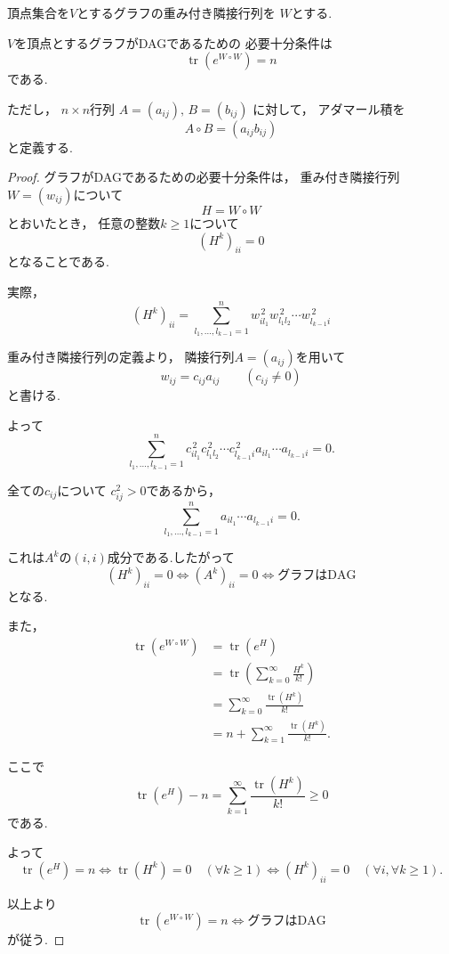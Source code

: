 \documentclass[uplatex, dvipdfmx]{jsarticle}
\begin{document}
\begin{thm}{}
  頂点集合を$V$とするグラフの重み付き隣接行列を
  $W$とする.

  $V$を頂点とするグラフがDAGであるための
  必要十分条件は
  \[
    \operatorname{tr}\!\left(e^{W\circ W}\right)=n
  \]
  である.

  ただし，
  $n\times n$行列
  $A=(a_{ij}),\,B=(b_{ij})$
  に対して，
  アダマール積を
  \[
    A\circ B=(a_{ij}b_{ij})
  \]
  と定義する.
\end{thm}

\begin{proof}
  グラフがDAGであるための必要十分条件は，
  重み付き隣接行列$W=(w_{ij})$について
  \[
    H=W\circ W
  \]
  とおいたとき，
  任意の整数$k\ge1$について
  \[
    (H^k)_{ii}=0
  \]
  となることである.

  実際，
  \[
    (H^k)_{ii} = \sum_{l_1,\ldots,l_{k-1}=1}^{n} w_{il_1}^{\,2} w_{l_1l_2}^{\,2} \cdots w_{l_{k-1}i}^{\,2}
  \]

  重み付き隣接行列の定義より，
  隣接行列$A=(a_{ij})$を用いて
  \[
    w_{ij}=c_{ij}a_{ij} \qquad(c_{ij}\neq0)
  \]
  と書ける.

  よって
  \[
    \sum_{l_1,\ldots,l_{k-1}=1}^{n}
    c_{i l_1}^{\,2}
    c_{l_1 l_2}^{\,2}
    \cdots
    c_{l_{k-1}i}^{\,2}
    a_{i l_1}\cdots a_{l_{k-1}i}
    =0.
  \]

  全ての$c_{ij}$について
  $c_{ij}^2>0$であるから，
  \[
    \sum_{l_1,\ldots,l_{k-1}=1}^{n}
    a_{i l_1}\cdots a_{l_{k-1}i}=0.
  \]

  これは$A^k$の$(i,i)$成分である.したがって
  \[
    (H^k)_{ii}=0
    \iff
    (A^k)_{ii}=0
    \iff
    \text{グラフはDAG}
  \]
  となる.

  また，
  \begin{align*}
    \operatorname{tr}(e^{W\circ W})
      &=\operatorname{tr}(e^H) \\
      &=\operatorname{tr}
      \left(
      \sum_{k=0}^{\infty}
      \frac{H^k}{k!}
      \right) \\
      &=\sum_{k=0}^{\infty}
      \frac{\operatorname{tr}(H^k)}{k!} \\
      &=n+
      \sum_{k=1}^{\infty}
      \frac{\operatorname{tr}(H^k)}{k!}.
  \end{align*}

  ここで
  \[
    \operatorname{tr}(e^H)-n
    =
    \sum_{k=1}^{\infty}
    \frac{\operatorname{tr}(H^k)}{k!}
    \ge0
  \]
  である.

  よって
  \[
    \operatorname{tr}(e^H)=n
    \iff
    \operatorname{tr}(H^k)=0
    \quad(\forall k\ge1)
    \iff
    (H^k)_{ii}=0
    \quad(\forall i,\forall k\ge1).
  \]

  以上より
  \[
    \operatorname{tr}(e^{W\circ W})=n
    \iff
    \text{グラフはDAG}
  \]
  が従う.
\end{proof}
\end{document}
